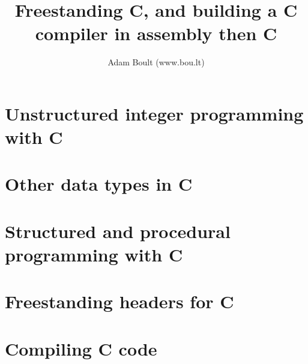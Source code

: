 \documentclass[oneside]{book}
\begin{document}
\author{Adam Boult (www.bou.lt)}
\title{Freestanding C, and building a C compiler in assembly then C}
\maketitle

\setcounter{tocdepth}{0}
\tableofcontents



\part{Unstructured integer programming with C}











\part{Other data types in C}






\part{Structured and procedural programming with C}








\part{Freestanding headers for C}











\part{Compiling C code}



\end{document}
